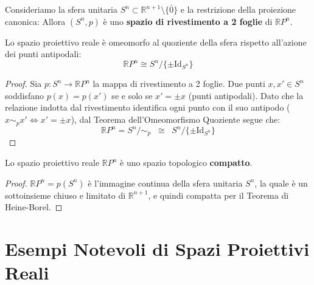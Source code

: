 \vspace{1.5em}

\begin{prop}
Consideriamo la sfera unitaria $S^n \subset \mathbb{R}^{n+1} \setminus \{\bar{0}\}$ e la restrizione della proiezione canonica:
Allora $(S^n, p)$ è uno \textbf{spazio di rivestimento a 2 foglie} di $\mathbb{R}P^n$.
\end{prop}

\begin{coro}
Lo spazio proiettivo reale è omeomorfo al quoziente della sfera rispetto all'azione dei punti antipodali:
\[
\mathbb{R}P^n \cong S^n \big/ \{ \pm \mathrm{Id}_{S^n} \}
\]
\end{coro}

\begin{proof}
Sia $p: S^n \to \mathbb{R}P^n$ la mappa di rivestimento a 2 foglie. Due punti $x, x' \in S^n$ soddisfano $p(x) = p(x')$ se e solo se $x' = \pm x$ (punti antipodali).
Dato che la relazione indotta dal rivestimento identifica ogni punto con il suo antipodo ($x \sim_p x' \iff x' = \pm x$), dal Teorema dell'Omeomorfismo Quoziente segue che:
\[
\mathbb{R}P^n = S^n \big/ \sim_p \;\;\cong\;\; S^n \big/ \{ \pm \mathrm{Id}_{S^n} \}
\]
\end{proof}

\begin{coro}
Lo spazio proiettivo reale $\mathbb{R}P^n$ è uno spazio topologico \textbf{compatto}.
\end{coro}

\begin{proof}
$\mathbb{R}P^n = p(S^n)$ è l'immagine continua della sfera unitaria $S^n$, la quale è un sottoinsieme chiuso e limitato di $\mathbb{R}^{n+1}$, e quindi compatta per il Teorema di Heine-Borel.
\end{proof}

\vspace{2em}

\section{Esempi Notevoli di Spazi Proiettivi Reali}

